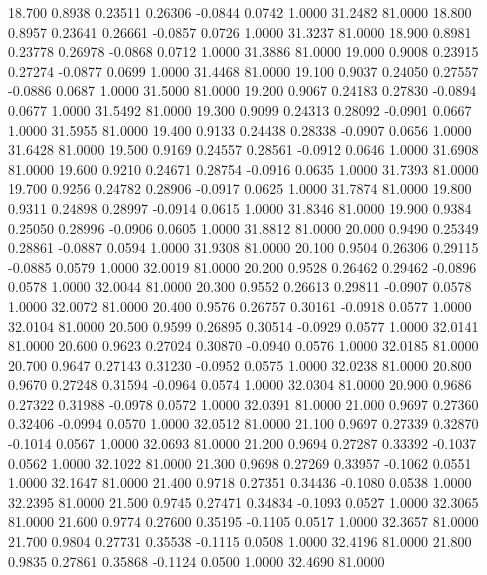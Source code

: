   18.700   0.8938   0.23511   0.26306  -0.0844   0.0742   1.0000  31.2482  81.0000
  18.800   0.8957   0.23641   0.26661  -0.0857   0.0726   1.0000  31.3237  81.0000
  18.900   0.8981   0.23778   0.26978  -0.0868   0.0712   1.0000  31.3886  81.0000
  19.000   0.9008   0.23915   0.27274  -0.0877   0.0699   1.0000  31.4468  81.0000
  19.100   0.9037   0.24050   0.27557  -0.0886   0.0687   1.0000  31.5000  81.0000
  19.200   0.9067   0.24183   0.27830  -0.0894   0.0677   1.0000  31.5492  81.0000
  19.300   0.9099   0.24313   0.28092  -0.0901   0.0667   1.0000  31.5955  81.0000
  19.400   0.9133   0.24438   0.28338  -0.0907   0.0656   1.0000  31.6428  81.0000
  19.500   0.9169   0.24557   0.28561  -0.0912   0.0646   1.0000  31.6908  81.0000
  19.600   0.9210   0.24671   0.28754  -0.0916   0.0635   1.0000  31.7393  81.0000
  19.700   0.9256   0.24782   0.28906  -0.0917   0.0625   1.0000  31.7874  81.0000
  19.800   0.9311   0.24898   0.28997  -0.0914   0.0615   1.0000  31.8346  81.0000
  19.900   0.9384   0.25050   0.28996  -0.0906   0.0605   1.0000  31.8812  81.0000
  20.000   0.9490   0.25349   0.28861  -0.0887   0.0594   1.0000  31.9308  81.0000
  20.100   0.9504   0.26306   0.29115  -0.0885   0.0579   1.0000  32.0019  81.0000
  20.200   0.9528   0.26462   0.29462  -0.0896   0.0578   1.0000  32.0044  81.0000
  20.300   0.9552   0.26613   0.29811  -0.0907   0.0578   1.0000  32.0072  81.0000
  20.400   0.9576   0.26757   0.30161  -0.0918   0.0577   1.0000  32.0104  81.0000
  20.500   0.9599   0.26895   0.30514  -0.0929   0.0577   1.0000  32.0141  81.0000
  20.600   0.9623   0.27024   0.30870  -0.0940   0.0576   1.0000  32.0185  81.0000
  20.700   0.9647   0.27143   0.31230  -0.0952   0.0575   1.0000  32.0238  81.0000
  20.800   0.9670   0.27248   0.31594  -0.0964   0.0574   1.0000  32.0304  81.0000
  20.900   0.9686   0.27322   0.31988  -0.0978   0.0572   1.0000  32.0391  81.0000
  21.000   0.9697   0.27360   0.32406  -0.0994   0.0570   1.0000  32.0512  81.0000
  21.100   0.9697   0.27339   0.32870  -0.1014   0.0567   1.0000  32.0693  81.0000
  21.200   0.9694   0.27287   0.33392  -0.1037   0.0562   1.0000  32.1022  81.0000
  21.300   0.9698   0.27269   0.33957  -0.1062   0.0551   1.0000  32.1647  81.0000
  21.400   0.9718   0.27351   0.34436  -0.1080   0.0538   1.0000  32.2395  81.0000
  21.500   0.9745   0.27471   0.34834  -0.1093   0.0527   1.0000  32.3065  81.0000
  21.600   0.9774   0.27600   0.35195  -0.1105   0.0517   1.0000  32.3657  81.0000
  21.700   0.9804   0.27731   0.35538  -0.1115   0.0508   1.0000  32.4196  81.0000
  21.800   0.9835   0.27861   0.35868  -0.1124   0.0500   1.0000  32.4690  81.0000

